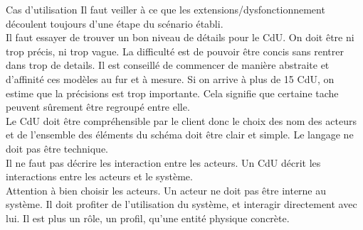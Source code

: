 \begin{LQ}{Cas d'utilisation}
{    Il faut veiller à ce que les extensions/dysfonctionnement découlent
    toujours d'une étape du scénario établi. \\

    Il faut essayer de trouver un bon niveau de détails pour le CdU. On doit
    être ni trop précis, ni trop vague. La difficulté est de pouvoir être
    concis sans rentrer dans trop de details. Il est conseillé de commencer de
    manière abstraite et d'affinité ces modèles au fur et à mesure. Si on
    arrive à plus de 15 CdU, on estime que la précisions est trop importante.
    Cela signifie que certaine tache peuvent sûrement être regroupé entre
    elle. \\

    Le CdU doit être compréhensible par le client donc le choix des nom des
    acteurs et de l'ensemble des éléments du schéma doit être clair et simple.
    Le langage ne doit pas être technique.\\

    Il ne faut pas décrire les interaction entre les acteurs. Un CdU décrit les
    interactions entre les acteurs et le système. \\

    Attention à bien choisir les acteurs. Un acteur ne doit pas être interne au
    système. Il doit profiter de l'utilisation du système, et interagir
    directement avec lui. Il est plus un rôle,
    un profil, qu'une entité physique concrète.
}


\end{LQ}
